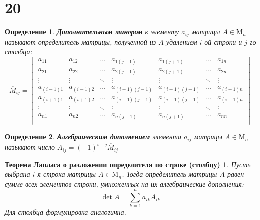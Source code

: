 \documentclass[a4paper,12pt]{article}
\newtheorem*{definition}{Определение}
\newtheorem*{laplace_theorem}{Теорема Лапласа о разложении определителя по строке (столбцу)}
\begin{document}
	\section*{20}
	\begin{definition}
		\textbf{Дополнительным минором} к элементу $a_{ij}$ матрицы $A \in \mathrm{M}_n$ называют определитель матрицы, полученной из $A$ удалением $i$-ой строки и $j$-го столбца:
		\[\overline{M}_{ij} = \begin{vmatrix}
		a_{11} & a_{12} & \ldots & a_{1(j-1)} & a_{1(j+1)} & \ldots & a_{1n} \\
		a_{21} & a_{22} & \ldots & a_{2(j-1)} & a_{2(j+1)} & \ldots & a_{2n} \\
		\vdots & \vdots & \ddots & \vdots     & \vdots     & \ddots & \vdots \\
		a_{(i-1)1} & a_{(i-1)2} & \ldots & a_{(i-1)(j-1)} & a_{(i-1)(j+1)} & \ldots & a_{(i-1)n} \\
		a_{(i+1)1} & a_{(i+1)2} & \ldots & a_{(i+1)(j-1)} & a_{(i+1)(j+1)} & \ldots & a_{(i+1)n} \\
		\vdots & \vdots & \ddots & \vdots     & \vdots     & \ddots & \vdots \\
		a_{n1} & a_{n2} & \ldots & a_{n(j-1)} & a_{n(j+1)} & \ldots & a_{nn} \\
		\end{vmatrix}\]
	\end{definition}
	\begin{definition}
		\textbf{Алгебраическим дополнением} элемента $a_{ij}$ матрицы $A \in \mathrm{M}_n$ называют число $A_{ij} = (-1)^{i+j}\overline{M}_{ij}$
	\end{definition}
	\begin{laplace_theorem}
		Пусть выбрана $i$-я строка матрицы $A \in \mathrm{M}_n$. Тогда определитель матрицы $A$ равен сумме всех элементов строки, умноженных на их алгебраические дополнения:
		\[\det{A} = \sum_{k = 1}^{n} a_{ik}A_{ik}\]
		Для столбца формулировка аналогична.
	\end{laplace_theorem}
\end{document}
